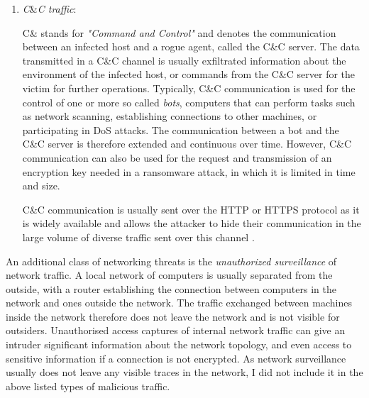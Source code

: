 \documentclass[a4paper,12pt,twoside]{report}
\begin{document}
\begin{enumerate}
Data manipulation attacks are often used pass malicious code to a victim in order to gain access on its machine. An impressive example of such behaviour was demonstrated by the malware \textit{Flame}\footnote{also known as \textit{Skywiper}}: An infected host in a network sends messages to other machines running Windows advertising itself as a Windows update provider, using spoofed IP addresses and a fake Microsoft certificate and thus defeating Microsoft's authentication mechanism. Other computers were consequently tricked into receiving malicious updates from the infected host, which would then infect their machine \cite{skywiperskywiper}.



\item \textit{C}\&\textit{C traffic}: 

C\& stands for \textit{"Command and Control"} and denotes the communication between an infected host and a rogue agent, called the C\&C server. The data transmitted in a C\&C channel is usually exfiltrated information about the environment of the infected host, or commands from the C\&C server for the victim for further operations. Typically, C\&C communication is used for the control of one or more so called \textit{bots}, computers that can perform tasks such as network scanning, establishing connections to other machines, or participating in DoS attacks. The communication between a bot and the C\&C server is therefore extended and continuous over time. However, C\&C communication can also be used for the request and transmission of an encryption key needed in a ransomware attack, in which it is limited in time and size. 

C\&C communication is usually sent over the HTTP or HTTPS protocol as it is widely available and allows the attacker to hide their communication in the large volume of diverse traffic sent over this channel \cite{lamprakis2017unsupervised}.

\end{enumerate}

An additional class of networking threats is the \textit{unauthorized surveillance} of network traffic. A local network of computers is usually separated from the outside, with a router establishing the connection between computers in the network and ones outside the network. The traffic exchanged between machines inside the network therefore does not leave the network and is not visible for outsiders. Unauthorised access captures of internal network traffic can give an intruder significant information about the network topology, and even access to sensitive information if a connection is not encrypted. As network surveillance usually does not leave any visible traces in the network, I did not include it in the above listed types of malicious traffic. 
\end{document}
